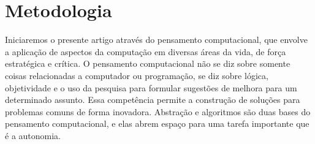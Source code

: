 \section{Metodologia}

Iniciaremos o presente artigo através do pensamento computacional, que envolve 
a aplicação de aspectos da computação em diversas áreas da vida, de força 
estratégica e crítica. O pensamento computacional não se diz sobre somente coisas
relacionadas a computador ou programação, se diz sobre lógica, objetividade e o 
uso da pesquisa para formular sugestões de melhora para um determinado assunto. 
Essa competência permite a construção de soluções para problemas comuns de forma inovadora.
Abstração e algoritmos são duas bases do pensamento computacional, e elas abrem espaço para 
uma tarefa importante que é a autonomia.